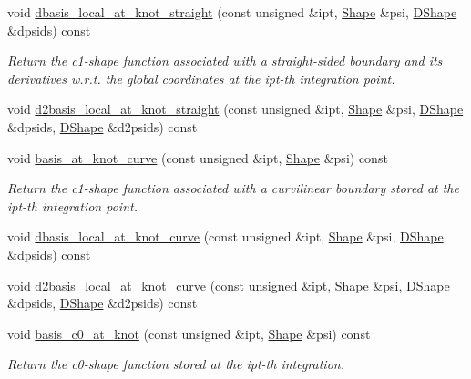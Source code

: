 \begin{DoxyCompactItemize}
void \hyperlink{classoomph_1_1C1CurvedElementBase_a74fedb14f6c859fdc0d0c37d77f63963}{dbasis\+\_\+local\+\_\+at\+\_\+knot\+\_\+straight} (const unsigned \&ipt, \hyperlink{classoomph_1_1Shape}{Shape} \&psi, \hyperlink{classoomph_1_1DShape}{D\+Shape} \&dpsids) const
\begin{DoxyCompactList}\small\item\em Return the c1-\/shape function associated with a straight-\/sided boundary and its derivatives w.\+r.\+t. the global coordinates at the ipt-\/th integration point. \end{DoxyCompactList}\item 
void \hyperlink{classoomph_1_1C1CurvedElementBase_a103822347941f4ac149d86066ca121a1}{d2basis\+\_\+local\+\_\+at\+\_\+knot\+\_\+straight} (const unsigned \&ipt, \hyperlink{classoomph_1_1Shape}{Shape} \&psi, \hyperlink{classoomph_1_1DShape}{D\+Shape} \&dpsids, \hyperlink{classoomph_1_1DShape}{D\+Shape} \&d2psids) const
\item 
void \hyperlink{classoomph_1_1C1CurvedElementBase_a849f18e06c42052a964fc6ee499b3c94}{basis\+\_\+at\+\_\+knot\+\_\+curve} (const unsigned \&ipt, \hyperlink{classoomph_1_1Shape}{Shape} \&psi) const
\begin{DoxyCompactList}\small\item\em Return the c1-\/shape function associated with a curvilinear boundary stored at the ipt-\/th integration point. \end{DoxyCompactList}\item 
void \hyperlink{classoomph_1_1C1CurvedElementBase_a834ee576efd64a3b9f70f6b0be1f26b9}{dbasis\+\_\+local\+\_\+at\+\_\+knot\+\_\+curve} (const unsigned \&ipt, \hyperlink{classoomph_1_1Shape}{Shape} \&psi, \hyperlink{classoomph_1_1DShape}{D\+Shape} \&dpsids) const
\item 
void \hyperlink{classoomph_1_1C1CurvedElementBase_a3062f4ef25e52d39a9b9ced665a361d0}{d2basis\+\_\+local\+\_\+at\+\_\+knot\+\_\+curve} (const unsigned \&ipt, \hyperlink{classoomph_1_1Shape}{Shape} \&psi, \hyperlink{classoomph_1_1DShape}{D\+Shape} \&dpsids, \hyperlink{classoomph_1_1DShape}{D\+Shape} \&d2psids) const
\item 
void \hyperlink{classoomph_1_1C1CurvedElementBase_a8f49d1ed702baf3693960c5d278d1495}{basis\+\_\+c0\+\_\+at\+\_\+knot} (const unsigned \&ipt, \hyperlink{classoomph_1_1Shape}{Shape} \&psi) const
\begin{DoxyCompactList}\small\item\em Return the c0-\/shape function stored at the ipt-\/th integration. \end{DoxyCompactList}\item 

\end{DoxyCompactItemize}
